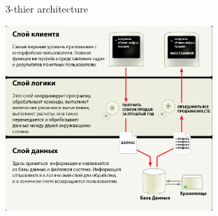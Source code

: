 \begin{frame}{3-thier architecture}
  \begin{center}
    \includegraphics[height=7cm,keepaspectratio]{sources/images/CSD_SCHEME.png}
  \end{center}
\end{frame}